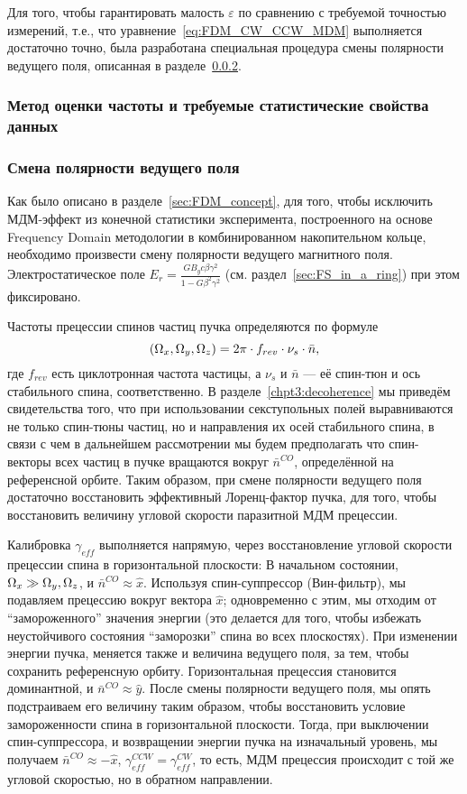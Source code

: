 Для того, чтобы гарантировать малость $\varepsilon$ по сравнению с требуемой точностью измерений, т.е., что уравнение~\eqref{eq:FDM_CW_CCW_MDM} выполняется достаточно точно, была разработана специальная процедура смены полярности ведущего поля, описанная в разделе~\ref{sec:field_flipping-theory}.

\subsubsection{Метод оценки частоты и требуемые статистические свойства данных}

\subsubsection{Смена полярности ведущего поля}\label{sec:field_flipping-theory}
Как было описано в разделе~\ref{sec:FDM_concept}, для того, чтобы исключить МДМ-эффект из конечной статистики эксперимента, построенного на основе Frequency Domain методологии в комбинированном накопительном кольце, необходимо произвести смену полярности ведущего магнитного поля. Электростатическое поле $E_r = \frac{GB_yc\beta\gamma^2}{1-G\beta^2\gamma^2}$ (см. раздел~\ref{sec:FS_in_a_ring}) при этом фиксировано.

Частоты прецессии спинов частиц пучка определяются по формуле~\cite[стр.~4]{COSY:SpinTuneMapping}
\[
(\Omega_x, \Omega_y, \Omega_z) = 2\pi\cdot f_{rev} \cdot \nu_s \cdot \bar n,
\]
где $f_{rev}$ есть циклотронная частота частицы, а $\nu_s$ и $\bar n$ --- её спин-тюн и ось стабильного спина, соответственно. В разделе~\ref{chpt3:decoherence} мы приведём свидетельства того, что при использовании секступольных полей выравниваются не только спин-тюны частиц, но и направления их осей стабильного спина, в связи с чем в дальнейшем рассмотрении мы будем предполагать что спин-векторы всех частиц в пучке вращаются вокруг $\bar n^{CO}$, определённой на референсной орбите. Таким образом, при смене полярности ведущего поля достаточно восстановить эффективный Лоренц-фактор пучка, для того, чтобы восстановить величину угловой скорости паразитной МДМ прецессии.

Калибровка $\gamma_{eff}$ выполняется напрямую, через восстановление угловой скорости прецессии спина в горизонтальной плоскости:
В начальном состоянии, $\Omega_x\gg \Omega_y, \Omega_z$, и $\bar n^{CO}\approx \hat x$. Используя спин-суппрессор (Вин-фильтр), мы подавляем прецессию вокруг вектора $\hat x$; одновременно с этим, мы отходим от ``замороженного'' значения энергии (это делается для того, чтобы избежать неустойчивого состояния ``заморозки'' спина во всех плоскостях). При изменении энергии пучка, меняется также и величина ведущего поля, за тем, чтобы сохранить референсную орбиту. Горизонтальная прецессия становится доминантной, и $\bar n^{CO} \approx \hat y$. После смены полярности ведущего поля, мы опять подстраиваем его величину таким образом, чтобы восстановить условие замороженности спина в горизонтальной плоскости. Тогда, при выключении спин-суппрессора, и возвращении энергии пучка на изначальный уровень, мы получаем $\bar n^{CO} \approx -\hat x$, $\gamma_{eff}^{CCW} = \gamma_{eff}^{CW}$, то есть, МДМ прецессия происходит с той же угловой скоростью, но в обратном направлении. 

